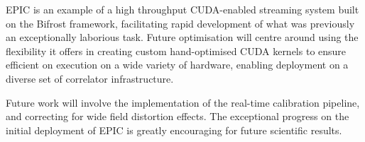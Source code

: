 \documentclass[bibliography=totocnumbered, twocolumn]{article}
\begin{document}
EPIC is an example of a high throughput CUDA-enabled streaming system
built on the Bifrost framework, facilitating rapid development of what
was previously an exceptionally laborious task. Future optimisation
will centre around using the flexibility it offers in creating custom
hand-optimised CUDA kernels to ensure efficient on execution on a
wide variety of hardware, enabling deployment on a diverse set of
correlator infrastructure.

Future work will involve the implementation of the real-time
calibration pipeline, and correcting for wide field distortion
effects. The exceptional progress on the initial deployment of
EPIC is greatly encouraging for future scientific results.



{}
\end{document}

